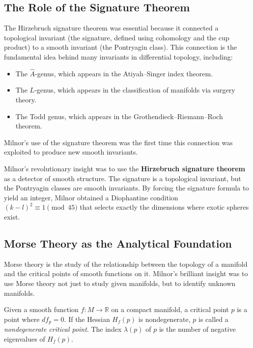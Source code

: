 \subsection{The Role of the Signature Theorem}

The Hirzebruch signature theorem was essential because it connected a topological invariant (the signature, defined using cohomology and the cup product) to a smooth invariant (the Pontryagin class). This connection is the fundamental idea behind many invariants in differential topology, including:
\begin{itemize}
\item The $\hat{A}$-genus, which appears in the Atiyah--Singer index theorem.
\item The $L$-genus, which appears in the classification of manifolds via surgery theory.
\item The Todd genus, which appears in the Grothendieck--Riemann--Roch theorem.
\end{itemize}

Milnor's use of the signature theorem was the first time this connection was exploited to produce new smooth invariants.

\begin{bigidea}
Milnor's revolutionary insight was to use the \textbf{Hirzebruch signature theorem} as a detector of smooth structure. The signature is a topological invariant, but the Pontryagin classes are smooth invariants. By forcing the signature formula to yield an integer, Milnor obtained a Diophantine condition $(k-l)^2 \equiv 1 \pmod{45}$ that selects exactly the dimensions where exotic spheres exist.
\end{bigidea}

\subsection{Morse Theory as the Analytical Foundation}

Morse theory is the study of the relationship between the topology of a manifold and the critical points of smooth functions on it. Milnor's brilliant insight was to use Morse theory not just to study given manifolds, but to identify unknown manifolds.

Given a smooth function $f: M \to \mathbb{R}$ on a compact manifold, a critical point $p$ is a point where $df_p = 0$. If the Hessian $H_f(p)$ is nondegenerate, $p$ is called a \emph{nondegenerate critical point}. The index $\lambda(p)$ of $p$ is the number of negative eigenvalues of $H_f(p)$.

